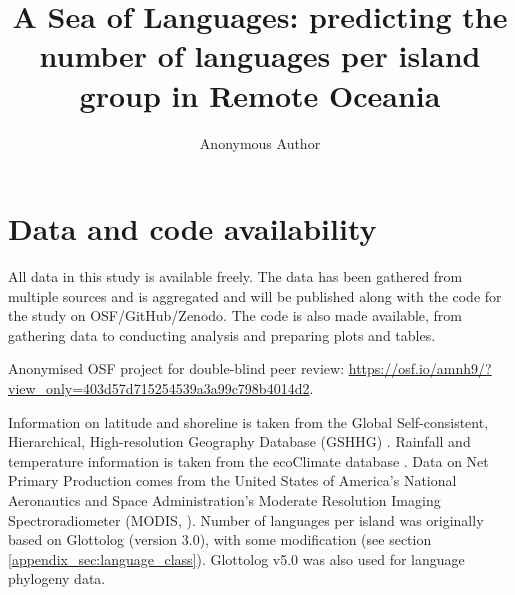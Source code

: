 \documentclass[12pt,letterpaper]{article}
\renewcommand*{\thesection}{\Alph{section}} %
\begin{document}
\title{A Sea of Languages: predicting the number of languages per island group in Remote Oceania}

\author{Anonymous Author}


\maketitle




\tableofcontents



\newpage
\section{Data and code availability}
\label{appendix_supp_data_availability}

All data in this study is available freely. The data has been gathered from multiple sources and is aggregated and will be published along with the code for the study on OSF/GitHub/Zenodo. The code is also made available, from gathering data to conducting analysis and preparing plots and tables. 

Anonymised OSF project for double-blind peer review: \url{https://osf.io/amnh9/?view_only=403d57d715254539a3a99c798b4014d2}.

Information on latitude and shoreline is taken from the Global Self-consistent, Hierarchical, High-resolution Geography Database (GSHHG) \citep{wessel1996global}. Rainfall and temperature information is taken from the ecoClimate database \citep{ecoclimate}. Data on Net Primary Production comes from the  United States of America's National Aeronautics and Space Administration's Moderate Resolution Imaging Spectroradiometer (MODIS, \citet{running2021modis_terra, running2021modis_aqua}). Number of languages per island was originally based on Glottolog (version 3.0), with some modification (see section \ref{appendix_sec:language_class}). Glottolog v5.0 \citet{Glottolog5} was also used for language phylogeny data. 
\end{document}
